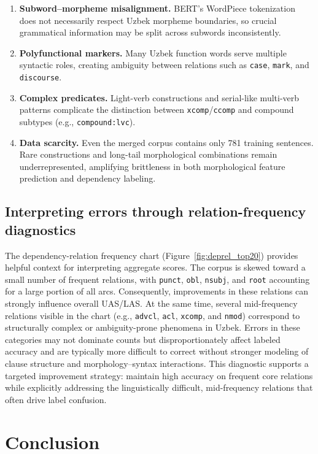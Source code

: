 \documentclass[runningheads]{llncs}
\begin{document}
\begin{enumerate}
    \item \textbf{Subword--morpheme misalignment.} BERT's WordPiece tokenization does not necessarily respect Uzbek morpheme boundaries, so crucial grammatical information may be split across subwords inconsistently.
    \item \textbf{Polyfunctional markers.} Many Uzbek function words serve multiple syntactic roles, creating ambiguity between relations such as \texttt{case}, \texttt{mark}, and \texttt{discourse}.
    \item \textbf{Complex predicates.} Light-verb constructions and serial-like multi-verb patterns complicate the distinction between \texttt{xcomp}/\texttt{ccomp} and compound subtypes (e.g., \texttt{compound:lvc}).
    \item \textbf{Data scarcity.} Even the merged corpus contains only 781 training sentences. Rare constructions and long-tail morphological combinations remain underrepresented, amplifying brittleness in both morphological feature prediction and dependency labeling.
\end{enumerate}

\subsection{Interpreting errors through relation-frequency diagnostics}
\label{subsec:disc_diagnostics}
The dependency-relation frequency chart (Figure~\ref{fig:deprel_top20}) provides helpful context for interpreting aggregate scores. The corpus is skewed toward a small number of frequent relations, with \texttt{punct}, \texttt{obl}, \texttt{nsubj}, and \texttt{root} accounting for a large portion of all arcs. Consequently, improvements in these relations can strongly influence overall UAS/LAS. At the same time, several mid-frequency relations visible in the chart (e.g., \texttt{advcl}, \texttt{acl}, \texttt{xcomp}, and \texttt{nmod}) correspond to structurally complex or ambiguity-prone phenomena in Uzbek. Errors in these categories may not dominate counts but disproportionately affect labeled accuracy and are typically more difficult to correct without stronger modeling of clause structure and morphology--syntax interactions. This diagnostic supports a targeted improvement strategy: maintain high accuracy on frequent core relations while explicitly addressing the linguistically difficult, mid-frequency relations that often drive label confusion.

\section{Conclusion}
\label{sec:conclusion}
\end{document}
